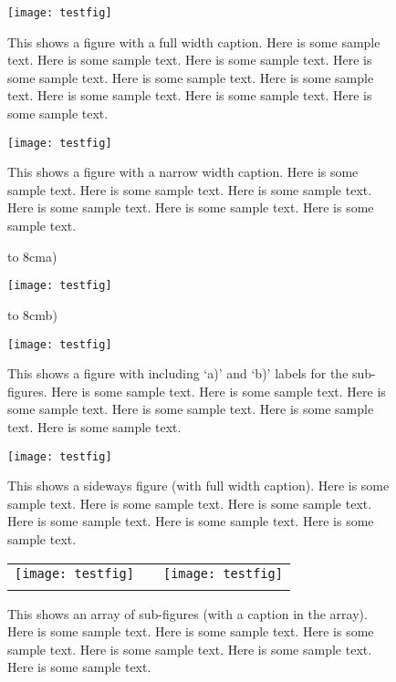 \begin{figure}
%
\centerline{\texttt{[image: testfig]}}
%
\medskip
%
\normalcaptionwidth\caption{This shows a figure with a full width
caption. Here is some sample text. Here is some sample text. Here is
some sample text. Here is some sample text. Here is some sample text.
Here is some sample text. Here is some sample text. Here is some sample
text. Here is some sample text.\label{f:fullwidth}}
%
\end{figure}

\begin{figure}
%
\centerline{\texttt{[image: testfig]}}
%
\medskip
%
\caption{This shows a figure with a narrow width caption. Here is
some sample text. Here is some sample text. Here is some sample text.
Here is some sample text. Here is some sample text. Here is some
sample text.\label{f:narrow}}
%
\end{figure}

\begin{figure}
%
\centerline{\hbox to 8cm{\large a)\hfill}}
\centerline{\texttt{[image: testfig]}}
\medskip
\centerline{\hbox to 8cm{\large b)\hfill}}
\centerline{\texttt{[image: testfig]}}
\medskip
%
\caption{This shows a figure with including `a)' and `b)' labels
for the sub-figures. Here is some sample text. Here is some sample text.
Here is some sample text. Here is some sample text. Here is some
sample text. Here is some sample text.\label{f:labels}}
%
\end{figure}

\begin{sidewaysfigure}
%
\centerline{\texttt{[image: testfig]}}
\medskip
%
\normalcaptionwidth\caption{This shows a sideways figure (with
full width caption). Here is some sample text. Here is some sample
text. Here is some sample text. Here is some sample text. Here is
some sample text. Here is some sample text.\label{f:landscape}}
%
\end{sidewaysfigure}

\begin{figure}
%
\begin{tabular}{p{6cm}cp{6cm}}
%
\texttt{[image: testfig]} & &
  \texttt{[image: testfig]} \\[15pt]
%
\raisebox{-\height}{\texttt{[image: testfig]}}
  & &
%
\normalcaptionwidth\caption{This shows an array of sub-figures
(with a caption in the array). Here is some sample text. Here is some
sample text. Here is some sample text. Here is some sample text. Here is
some sample text. Here is some sample text.\label{f:2x2}}
%
\end{tabular}
%
\end{figure}

\endinput
